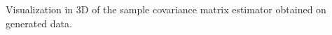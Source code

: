 Visualization in 3D of the sample covariance matrix estimator obtained on generated data.
\label{fig:cov}